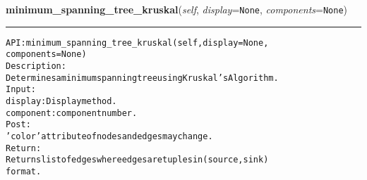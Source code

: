     \label{coinor:gimpy:graph:Graph:minimum_spanning_tree_kruskal}

    \vspace{0.5ex}

\hspace{.8\funcindent}\begin{boxedminipage}{\funcwidth}

    \raggedright \textbf{minimum\_spanning\_tree\_kruskal}(\textit{self}, \textit{display}={\tt None}, \textit{components}={\tt None})

    \vspace{-1.5ex}

    \rule{\textwidth}{0.5\fboxrule}
\setlength{\parskip}{2ex}
\begin{alltt}

API: minimum\_spanning\_tree\_kruskal(self, display = None,
                                   components = None)
Description:
Determines a minimum spanning tree using Kruskal's Algorithm.
Input:
    display: Display method.
    component: component number.
Post:
    'color' attribute of nodes and edges may change.
Return:
    Returns list of edges where edges are tuples in (source,sink)
    format.
\end{alltt}

\setlength{\parskip}{1ex}
    \end{boxedminipage}

    \label{coinor:gimpy:graph:Graph:minimum_spanning_tree_prim}

    \vspace{0.5ex}

